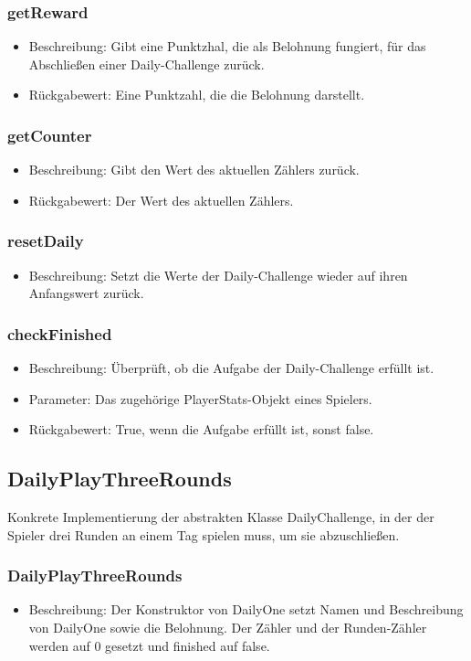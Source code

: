 \documentclass[a4paper]{scrreprt}
\begin{document}
	\subsubsection{getReward}
	\begin{itemize}
		\item Beschreibung: Gibt eine Punktzhal, die als Belohnung fungiert, für das Abschließen einer Daily-Challenge zurück.
		\item Rückgabewert: Eine Punktzahl, die die Belohnung darstellt.
	\end{itemize}
	\subsubsection{getCounter}
	\begin{itemize}
		\item Beschreibung: Gibt den Wert des aktuellen Zählers zurück.
		\item Rückgabewert: Der Wert des aktuellen Zählers.
	\end{itemize}
	\subsubsection{resetDaily}
	\begin{itemize}
		\item Beschreibung: Setzt die Werte der Daily-Challenge wieder auf ihren Anfangswert zurück.
	\end{itemize}
	\subsubsection{checkFinished}
	\begin{itemize}
		\item Beschreibung: Überprüft, ob die Aufgabe der Daily-Challenge erfüllt ist.
		\item Parameter: Das zugehörige PlayerStats-Objekt eines Spielers.
		\item Rückgabewert: True, wenn die Aufgabe erfüllt ist, sonst false.
	\end{itemize}

	\subsection{DailyPlayThreeRounds}
	Konkrete Implementierung der abstrakten Klasse DailyChallenge, in der der Spieler drei Runden an einem Tag spielen muss, um sie abzuschließen.
	\subsubsection{DailyPlayThreeRounds}
	\begin{itemize}
		\item Beschreibung: Der Konstruktor von DailyOne setzt Namen und Beschreibung von DailyOne sowie die Belohnung. Der Zähler und der Runden-Zähler werden auf 0 gesetzt und finished auf false.
	\end{itemize}
\end{document}
